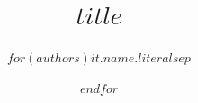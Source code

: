 \title{$title$}
\author{$for(authors)$$it.name.literal$$sep$ \and $endfor$}
\newcommand{\unladviserabstract}{$unl.adviser-abstract$}
